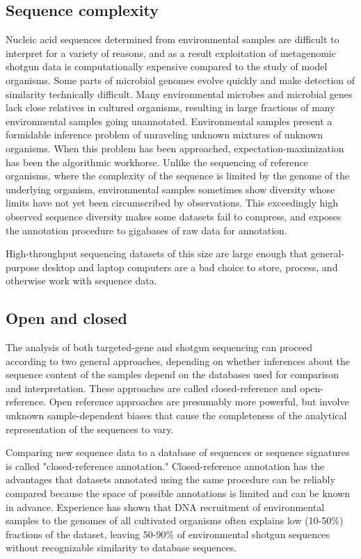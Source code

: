 \documentclass[graybox]{svmult}
\begin{document}
\subsection{Sequence complexity}
Nucleic acid sequences determined from environmental samples are difficult to interpret for a variety of reasons, and as a result exploitation of metagenomic shotgun data is computationally expensive compared to the study of model organisms.
Some parts of microbial genomes evolve quickly and make detection of similarity technically difficult.
Many environmental microbes and microbial genes lack close relatives in cultured organisms, resulting in large fractions of many environmental samples going unannotated.
Environmental samples present a formidable inference problem of unraveling unknown mixtures of unknown organisms.  When this problem has been approached, expectation-maximization has been the algorithmic workhorse.
Unlike the sequencing of reference organisms, where the complexity of the sequence is limited by the genome of the underlying organism, environmental samples sometimes show diversity whose limits have not yet been circumscribed by observations.  This exceedingly high observed sequence diversity makes some datasets fail to compress, and exposes the annotation procedure to gigabases of raw data for annotation.

High-throughput sequencing datasets of this size are large enough that general-purpose desktop and laptop computers are a bad choice to store, process, and otherwise work with sequence data. 

\subsection{Open and closed}
The analysis of both targeted-gene and shotgun sequencing can proceed according to two general approaches, depending on whether inferences about the sequence content of the samples depend on the databases used for comparison and interpretation.  These approaches are called closed-reference and open-reference.  Open reference approaches are presumably more powerful, but involve unknown sample-dependent biases that cause the completeness of the analytical representation of the sequences to vary.

Comparing new sequence data to a database of sequences or sequence signatures is called "closed-reference annotation."  Closed-reference annotation has the advantages that datasets annotated using the same procedure can be reliably compared because the space of possible annotations is limited and can be known in advance.
Experience has shown that DNA recruitment of environmental samples to the genomes of all cultivated organisms often explains low (10-50\%) fractions of the dataset, leaving 50-90\% of environmental shotgun sequences without recognizable similarity to database sequences.
\end{document}
